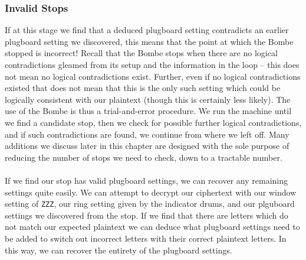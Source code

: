 
\subsubsection{Invalid Stops}
If at this stage we find that a deduced plugboard setting contradicts
an earlier plugboard setting we discovered, this means that the point
at which the Bombe stopped is incorrect! Recall that the Bombe stops
when there are no logical contradictions gleamed from its setup and
the information in the loop -- this does not mean no logical
contradictions exist. Further, even if no logical contradictions
existed that does not mean that this is the only such setting which could
be logically consistent with our plaintext (though this is certainly
less likely). The use of the Bombe is thus a trial-and-error
procedure. We run the machine until we find a candidate stop, then we
check for possible further logical contradictions, and if such
contradictions are found, we continue from where we left off. Many
additions we discuss later in this chapter are designed with the sole
purpose of reducing the number of stops we need to check, down to a
tractable number.
\\\\If we find our stop has valid plugboard settings, we can recover
any remaining settings quite easily. We can attempt to decrypt our
ciphertext with our window setting of \texttt{ZZZ}, our ring setting
given by the indicator drums, and our plguboard settings we
discovered from the stop. If we find that there are letters which do
not match our expected plaintext we can deduce what plugboard
settings need to be added to switch out incorrect letters with their
correct plaintext letters. In this way, we can recover the entirety of
the plugboard settings.

